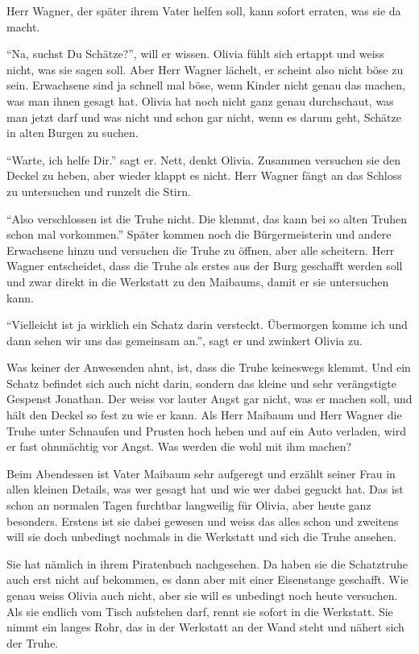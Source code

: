 Herr Wagner, der später ihrem Vater helfen soll, kann sofort erraten, was sie da macht. 

\enquote{Na, suchst Du Schätze?}, will er wissen. Olivia fühlt sich ertappt und
weiss nicht, was sie sagen soll. Aber Herr Wagner lächelt, er scheint also nicht böse zu sein. Erwachsene sind ja schnell mal böse, wenn Kinder nicht genau das machen, was man ihnen gesagt hat. Olivia hat noch nicht ganz genau durchschaut, was man jetzt darf und was nicht und schon gar nicht, wenn es darum geht, Schätze in alten Burgen zu suchen.

\enquote{Warte, ich helfe Dir.} sagt er. Nett, denkt Olivia. Zusammen versuchen sie den Deckel zu heben, aber wieder klappt es nicht. Herr Wagner fängt an das Schloss zu untersuchen und runzelt die Stirn.

\enquote{Also verschlossen ist die Truhe nicht. Die klemmt, das kann bei so alten Truhen schon mal vorkommen.} Später kommen noch die Bürgermeisterin und andere Erwachsene hinzu und versuchen die Truhe zu öffnen, aber alle scheitern. Herr Wagner entscheidet, dass die Truhe als erstes aus der Burg geschafft werden soll und zwar direkt in die Werkstatt zu den Maibaums, damit er sie untersuchen kann.

\enquote{Vielleicht ist ja wirklich ein Schatz darin versteckt. Übermorgen komme ich und dann sehen wir uns das gemeinsam an.}, sagt er und zwinkert Olivia zu. 

Was keiner der Anwesenden ahnt, ist, dass die Truhe keineswegs klemmt. Und ein
Schatz befindet sich auch nicht darin, sondern das kleine und sehr verängstigte
Gespenst Jonathan. Der weiss vor lauter Angst gar nicht, was er machen soll, und hält den Deckel so fest zu wie er kann. Als Herr Maibaum und Herr Wagner die Truhe unter Schnaufen und Prusten hoch heben und auf ein Auto verladen, wird er fast ohnmächtig vor Angst. Was werden die wohl mit ihm machen?

Beim Abendessen ist Vater Maibaum sehr aufgeregt und erzählt seiner Frau in allen kleinen Details, was wer gesagt hat und wie wer dabei geguckt hat. Das ist schon an normalen Tagen furchtbar langweilig für Olivia, aber heute ganz besonders. Erstens ist sie dabei gewesen und weiss das alles schon und zweitens will sie doch unbedingt nochmals in die Werkstatt und sich die Truhe ansehen. 

Sie hat nämlich in ihrem Piratenbuch nachgesehen. Da haben sie die Schatztruhe
auch erst nicht auf bekommen, es dann aber mit einer Eisenstange geschafft. Wie
genau weiss Olivia auch nicht, aber sie will es unbedingt noch heute versuchen.
Als sie endlich vom Tisch aufstehen darf, rennt sie sofort in die Werkstatt. Sie nimmt ein langes Rohr, das in der Werkstatt an der Wand steht und nähert sich der Truhe.

